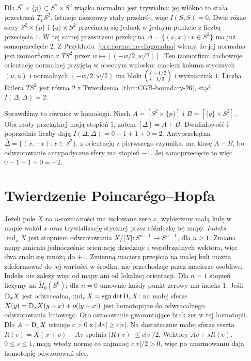 \begin{przyklad}
Dla $S^2\times\{p\}
\subset S^2\times S^2$
wiązka normalna jest
trywialna: jej włókno
to stała przestrzeń
$T_pS^2$. Istnieje
niezerowy stały
przekrój, więc
$I(S,S)=0$.
Dwie różne sfery
$S^2\times\{p\}$
i $\{q\}\times S^2$
przecinają się
jednak w jednym
punkcie z liczbą
przecięcia $1$.
W tej samej przestrzeni przekątna
$\Delta=\{(x,x):x\in S^2\}$ ma już samoprzecięcie $2$.
Z Przykładu~\ref{prz:normalna-diagonalna} wiemy,
że jej normalna jest izomorficzna z $TS^2$ przez
$w\mapsto[(-w/2,w/2)]$.
Ten izomorfizm zachowuje orientację normalnej
przyjętą w obecnym wniosku:
macierz kolumn stycznych $(u,u)$ i normalnych $(-w/2,w/2)$
ma bloki
$\begin{psmallmatrix}I&-I/2\\ I&I/2\end{psmallmatrix}$
i wyznacznik $1$.
Liczba Eulera $TS^2$ jest równa $2$ z
Twierdzenia~\ref{thm:CGB-boundary-26},
stąd $I(\Delta,\Delta)=2$.

Sprawdźmy to również w homologii.
Niech $A=[S^2\times\{p\}]$ i $B=[\{q\}\times S^2]$.
Oba rzuty przekątnej mają stopień $1$, zatem
$[\Delta]=A+B$. Dwuliniowość i poprzednie liczby dają
$I(\Delta,\Delta)=0+1+1+0=2$.
Antyprzekątna $\overline\Delta=\{(x,-x):x\in S^2\}$,
z orientacją z pierwszego czynnika, ma klasę $A-B$,
bo odwzorowanie antypodyczne sfery ma stopień $-1$.
Jej samoprzecięcie to więc $0-1-1+0=-2$.
\end{przyklad}

\section{Twierdzenie Poincarégo--Hopfa}
\label{sec:poincare-hopf-16}

\begin{definicja}
Jeżeli pole $X$ na
$n$-rozmaitości ma
izolowane zero $x$,
wybierzmy małą kulę w mapie wokół $x$
oraz trywializację stycznej przez różniczkę tej mapy.
\emph{Indeks} $\operatorname{ind}_x X$
jest stopniem odwzorowania
$X/|X|:S^{n-1}\to S^{n-1}$, dla $n\geq1$.
Zmiana mapy zmienia jednocześnie orientację dziedziny
i współrzędnych wektora, więc dwa znaki się mnożą
do $+1$. Zmienną macierz przejścia na małej kuli
można zdeformować do jej wartości w środku, nie
przechodząc przez macierze osobliwe. Indeks nie
zależy więc od mapy ani od lokalnej orientacji.
Dla $n=1$ stopień liczymy na $\widetilde H_0(S^0)$;
dla $n=0$ umownie każdy punkt zerowy ma indeks $1$.
Jeśli $\mathrm D_xX$ jest
odwracalna,
$\operatorname{ind}_xX
=\operatorname{sgn}\det\mathrm D_xX$:
na małej sferze
$X(y)=\mathrm D_xX(y-x)+o(|y-x|)$
jest homotopijne
do odwracalnego
odwzorowania liniowego.
Oto oszacowanie gwarantujące brak zer w tej homotopii.
Dla $A=\mathrm D_xX$ istnieje $c>0$ z $|Av|\geq c|v|$.
Na dostatecznie małej sferze reszta $R(v)=X(x+v)-Av$
spełnia $|R(v)|\leq c|v|/2$.
Wektory $Av+sR(v)$, $0\leq s\leq1$, mają wtedy normę
co najmniej $c|v|/2>0$, więc po unormowaniu dają
homotopię odwzorowań sfer.
\end{definicja}

